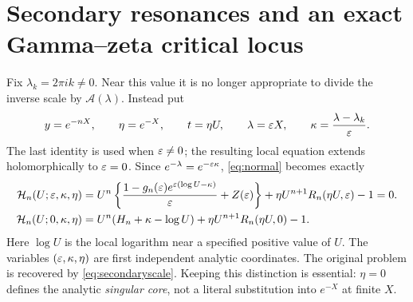 \documentclass[11pt,a4paper]{article}
\numberwithin{equation}{section}
\theoremstyle{definition}\newtheorem{definition}[theorem]{Definition}
\theoremstyle{remark}\newtheorem{remark}[theorem]{Remark}
\newcommand{\A}{\mathcal A}\newcommand{\E}{\mathcal E}
\newcommand{\HH}{\mathcal H}
\begin{document}
\section{Secondary resonances and an exact Gamma--zeta critical locus}
\label{sec:secondary}
Fix $\lambda_k=2\pi i k\ne0$. Near this value it is no longer appropriate
to divide the inverse scale by $\A(\lambda)$. Instead put
\begin{equation}\label{eq:secondaryscale}
 y=e^{-nX},\qquad \eta=e^{-X},\qquad t=\eta U,\qquad
 \lambda=\varepsilon X,\qquad \kappa=\frac{\lambda-\lambda_k}{\varepsilon}.
\end{equation}
The last identity is used when $\varepsilon\ne0$; the resulting local equation
extends holomorphically to $\varepsilon=0$. Since $e^{-\lambda}=e^{-\varepsilon\kappa}$,
\eqref{eq:normal} becomes exactly
\begin{align}
 \HH_n(U;\eps,\kappa,\eta)
 &=U^n\left\{\frac{1-g_n(\eps)e^{\eps(\log U-\kappa)}}{\eps}
                     +Z(\eps)\right\}
       +\eta U^{n+1}R_n(\eta U,\eps)-1=0.\label{eq:H}\\
 \HH_n(U;0,\kappa,\eta)
 &=U^n(H_n+\kappa-\log U)
       +\eta U^{n+1}R_n(\eta U,0)-1.\label{eq:H0all}
\end{align}
Here $\log U$ is the local logarithm near a specified positive value of
$U$. The variables $(\varepsilon,\kappa,\eta)$ are first independent analytic
coordinates. The original problem is recovered by \eqref{eq:secondaryscale}.
Keeping this distinction is essential: $\eta=0$ defines the analytic
\emph{singular core}, not a literal substitution into $e^{-X}$ at finite $X$.
\end{document}

